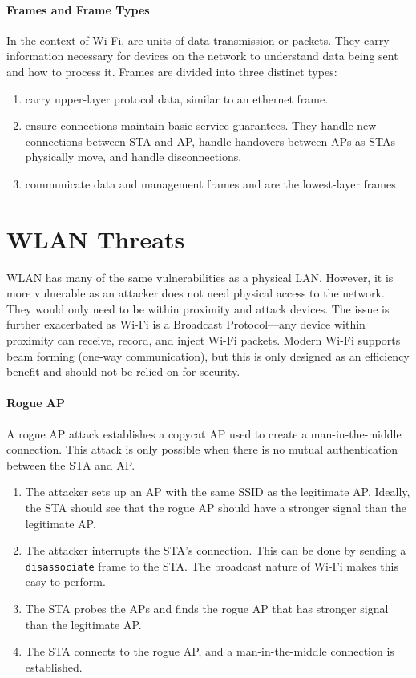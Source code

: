 \paragraph{Frames and Frame Types}
In the context of Wi-Fi,  are units of data transmission or packets. They carry information necessary for devices on the network to understand data being sent and how to process it. Frames are divided into three distinct types:
\begin{enumerate}
    \item {} carry upper-layer protocol data, similar to an ethernet frame.
    \item {} ensure connections maintain basic service guarantees. They handle new connections between STA and AP, handle handovers between APs as STAs physically move, and handle disconnections.
    \item {} communicate data and management frames and are the lowest-layer frames
\end{enumerate}

\section{WLAN Threats}
WLAN has many of the same vulnerabilities as a physical LAN. However, it is more vulnerable as an attacker does not need physical access to the network. They would only need to be within proximity and attack devices. The issue is further exacerbated as Wi-Fi is a Broadcast Protocol---any device within proximity can receive, record, and inject Wi-Fi packets. Modern Wi-Fi supports beam forming (one-way communication), but this is only designed as an efficiency benefit and should not be relied on for security.

\paragraph{Rogue AP}
A rogue AP attack establishes a copycat AP used to create a man-in-the-middle connection. This attack is only possible when there is no mutual authentication between the STA and AP.
\begin{enumerate}
    \item The attacker sets up an AP with the same SSID as the legitimate AP. Ideally, the STA should see that the rogue AP should have a stronger signal than the legitimate AP.
    \item The attacker interrupts the STA's connection. This can be done by sending a \texttt{disassociate} frame to the STA. The broadcast nature of Wi-Fi makes this easy to perform.
    \item The STA probes the APs and finds the rogue AP that has stronger signal than the legitimate AP.
    \item The STA connects to the rogue AP, and a man-in-the-middle connection is established.
\end{enumerate}

